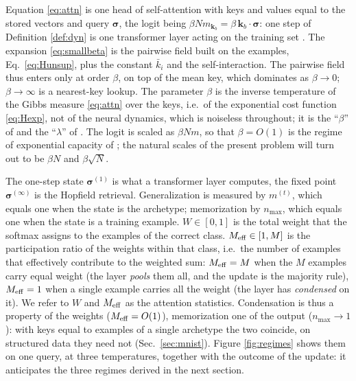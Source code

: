 \documentclass[11pt,a4paper]{article}
\newcommand{\s}{\bm{\sigma}}
\newcommand{\Meff}{M_{\rm eff}}
\begin{document}
Equation \eqref{eq:attn} is one head of self-attention with keys and values equal to the stored vectors and query $\s$, the logit being $\beta N m_{\bm k_b}=\beta\,\bm k_b\cdot\s$: one step of Definition \ref{def:dyn} is one transformer layer acting on the training set \cite{Ramsauer2021}. The expansion \eqref{eq:smallbeta} is the pairwise field built on the examples, Eq.\ \eqref{eq:Hunsup}, plus the constant $\bar k_i$ and the self-interaction. The pairwise field thus enters only at order $\beta$, on top of the mean key, which dominates as $\beta\to0$; $\beta\to\infty$ is a nearest-key lookup. The parameter $\beta$ is the inverse temperature of the Gibbs measure \eqref{eq:attn} over the keys, i.e.\ of the exponential cost function \eqref{eq:Hexp}, not of the neural dynamics, which is noiseless throughout; it is the ``$\beta$'' of \cite{Ramsauer2021} and the ``$\lambda$'' of \cite{Lucibello2024}. The logit is scaled as $\beta N m$, so that $\beta=O(1)$ is the regime of exponential capacity of \cite{Lucibello2024,Albanese2025exp}; the natural scales of the present problem will turn out to be $\beta N$ and $\beta\sqrt N$.

The one-step state $\s^{(1)}$ is what a transformer layer computes, the fixed point $\s^{(\infty)}$ is the Hopfield retrieval. Generalization is measured by $m^{(t)}$, which equals one when the state is the archetype; memorization by $n_{\max}$, which equals one when the state is a training example. $W\in[0,1]$ is the total weight that the softmax assigns to the examples of the correct class. $\Meff\in[1,M]$ is the participation ratio of the weights within that class, i.e.\ the number of examples that effectively contribute to the weighted sum: $\Meff=M$ when the $M$ examples carry equal weight (the layer \emph{pools} them all, and the update is the majority rule), $\Meff=1$ when a single example carries all the weight (the layer has \emph{condensed} on it). We refer to $W$ and $\Meff$ as the attention statistics. Condensation is thus a property of the weights ($\Meff=O(1)$), memorization one of the output ($n_{\max}\to1$): with keys equal to examples of a single archetype the two coincide, on structured data they need not (Sec.\ \ref{sec:mnist}). Figure \ref{fig:regimes} shows them on one query, at three temperatures, together with the outcome of the update: it anticipates the three regimes derived in the next section.
\end{document}
